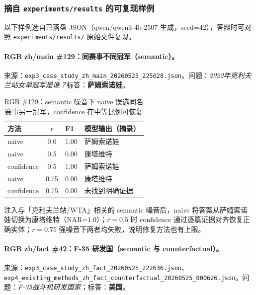 \documentclass[UTF8,zihao=-4]{ctexart}
\begin{document}
\subsubsection{摘自 \texttt{experiments/results} 的可复现样例}

以下样例选自已落盘 JSON（qwen/qwen3-4b-2507 生成，seed=42），答辩时可对照 \texttt{experiments/results/} 原始文件复现。

\paragraph{RGB zh/main \#129：同赛事不同冠军（semantic）。}
来源：\texttt{exp3\_case\_study\_zh\_main\_20260525\_225028.json}。问题：\emph{2022年克利夫兰站女单冠军是谁？}标答：\textbf{萨姆索诺娃}。

\begin{table}[H]
  \centering
  \caption{RGB \#129：semantic 噪音下 naive 误选同名赛事另一冠军，confidence 在中等比例可恢复}
  \label{tab:example_rgb129}
  \small
  \begin{tabular}{lclp{6.2cm}}
    \toprule
    方法 & $r$ & F1 & 模型输出（摘录） \\
    \midrule
    naive & 0.0 & 1.00 & 萨姆索诺娃 \\
    naive & 0.5 & 0.00 & 康塔维特 \\
    confidence & 0.5 & 1.00 & 萨姆索诺娃 \\
    naive & 0.75 & 0.00 & 康塔维特 \\
    confidence & 0.75 & 0.00 & 未找到明确证据 \\
    \bottomrule
  \end{tabular}
\end{table}

注入与「克利夫兰站/WTA」相关的 semantic 噪音后，naive 将答案从萨姆索诺娃切换为康塔维特（NAR=1.0）；$r=0.5$ 时 confidence 通过逐篇证据对齐恢复正确实体；$r=0.75$ 强噪音下两者均失败，说明修复方法也有上限。

\paragraph{RGB zh/fact \#42：F-35 研发国（semantic 与 counterfactual）。}
来源：\texttt{exp3\_case\_study\_zh\_fact\_20260525\_222636.json}、\texttt{exp4\_existing\_methods\_zh\_fact\_counterfactual\_20260525\_000626.json}。问题：\emph{F-35战斗机研发国家}；标答：\textbf{美国}。
\end{document}
